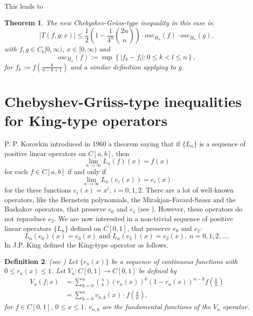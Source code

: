 \documentclass[12pt,leqno,a4paper,dvips,twoside]{article}
\newtheorem{thm}{Theorem}[section]
\newtheorem{defin}[thm]{Definition}
\begin{document}
{This leads to

\begin{thm}
The new Chebyshev-Gr\"{u}ss-type inequality in this case is:
	\begin{equation}
		\left|T(f,g;x)\right|\leq \frac{1}{2}\left(1-\frac{1}{4^n}\binom{2n}{n}\right)\cdot osc_{H_n}(f)\cdot osc_{H_n}(g),
	\end{equation}
with 	$f,g\in C_b[0,\infty)$, $x\in [0,\infty)$ and  
	\begin{equation*}
		osc_{H_n}(f):=\sup \left\{\left|f_k-f_l\right|:0\leq k<l\leq n\right\},
	\end{equation*}
for $f_k:=f\left(\frac{k}{n-k+1}\right)$ and a similar definition applying to $g$. 
\end{thm}
\section{Chebyshev-Gr\"{u}ss-type inequalities for King-type operators}

P. P. Korovkin \cite{korovkin:1960} introduced in 1960 a theorem saying that if $\{L_n\}$ is a sequence of positive linear operators on $C[a,b]$, then 
	\begin{equation*}
		\lim_{n\to \infty}L_n(f)(x)=f(x)
	\end{equation*}
for each $f\in C[a,b]$ if and only if 
	\begin{equation*}
		\lim_{n\to \infty}L_n(e_i(x))=e_i(x)
	\end{equation*}
for the three functions $e_i(x)=x^{i},\ i=0,1,2$. There are a lot of well-known operators, like the Bernstein polynomials, the Mirakjan-Favard-Sz$\acute{a}$sz and the Baskakov operators, that preserve $e_0$ and $e_1$ (see \cite{king:2003}). However, these operators do not reproduce $e_2$. We are now interested in a non-trivial sequence of positive linear operators $\{L_n\}$ defined on $C[0,1]$, that preserve $e_0$ and
$e_2$:
	\begin{equation*}
		L_n(e_0)(x)=e_0(x) \text{ and } L_n(e_2)(x)=e_2(x),\ n=0,1,2,\ldots.
	\end{equation*}
In \cite{king:2003} J.P. King defined the King-type operator as follows. 

\begin{defin}(see \cite{king:2003})
	Let $\{r_n(x)\}$ be a sequence of continuous functions with $0\leq r_n(x)\leq 1$.
	Let $V_n:C[0,1]\to C[0,1]$ be defined by
		\begin{align*}
			V_n(f;x)&=\sum^{n}_{k=0}{\binom{n}{k}(r_n(x))^k(1-r_n(x))^{n-k}f\left(\frac{k}{n}\right)}\\
			&=\sum^{n}_{k=0}{v_{n,k}(x)\cdot f\left(\frac{k}{n}\right)},
		\end{align*}
	for $f\in C[0,1]$, $0\leq x\leq 1$. $v_{n,k}$ are the fundamental functions of the $V_n$ operator. 
\end{defin} 

}
\end{document}
